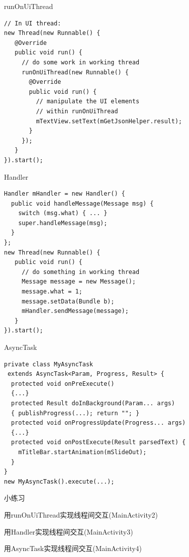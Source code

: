 \documentclass[presentation,dvipdfmx,CJKbookmarks]{beamer}
\begin{document}
\begin{CJK*}{UTF8}{simsun}
\begin{frame}[fragile,label={sec:org68d6391}]{runOnUiThread}
 \begin{verbatim}
// In UI thread:
new Thread(new Runnable() {
   @Override
   public void run() {
     // do some work in working thread
     runOnUiThread(new Runnable() {
       @Override
       public void run() {
         // manipulate the UI elements
         // within runOnUiThread
         mTextView.setText(mGetJsonHelper.result);
       }
     });
   }
}).start();
\end{verbatim}
\end{frame}

\begin{frame}[fragile,label={sec:org9d1fa4a}]{Handler}
 \begin{verbatim}
Handler mHandler = new Handler() {
  public void handleMessage(Message msg) {
    switch (msg.what) { ... }
    super.handleMessage(msg);
  }
};
new Thread(new Runnable() {
   public void run() {
     // do something in working thread
     Message message = new Message();
     message.what = 1;
     message.setData(Bundle b);
     mHandler.sendMessage(message);
   }
}).start();
\end{verbatim}
\end{frame}

\begin{frame}[fragile,label={sec:orgbf2c7bd}]{AsyncTask}
 \begin{verbatim}
private class MyAsyncTask
 extends AsyncTask<Param, Progress, Result> {
  protected void onPreExecute()
  {...}
  protected Result doInBackground(Param... args)
  { publishProgress(...); return ""; }
  protected void onProgressUpdate(Progress... args)
  {...}
  protected void onPostExecute(Result parsedText) {
    mTitleBar.startAnimation(mSlideOut);
  }
}
new MyAsyncTask().execute(...);
\end{verbatim}
\end{frame}
\begin{frame}[label={sec:org5d3f082}]{小练习}
\begin{block}{用\thinspace runOnUiThread\thinspace 实现线程间交互\thinspace (MainActivity2)}
\end{block}
\begin{block}{用\thinspace Handler\thinspace 实现线程间交互\thinspace (MainActivity3)}
\end{block}
\begin{block}{用\thinspace AsyncTask\thinspace 实现线程间交互\thinspace (MainActivity4)}
\end{block}
\end{frame}


\end{CJK*}
\end{document}
